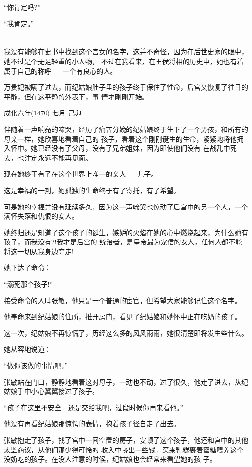 \documentclass[11pt,a4paper,onecolumn]{article}
\begin{document}
``你肯定吗?''

``我肯定。''

\section[\thesection]{}

我没有能够在史书中找到这个宫女的名字，这并不奇怪，因为在后世史家的眼中，她不过是个无足轻重的小人物，
不过在我看来，在王侯将相的历史中，她也有着属于自己的称呼 --- 一个有良心的人。

万贵妃被瞒了过去，而纪姑娘肚子里的孩子终于保住了性命，后宫又恢复了往日的平静，但在这平静的外表下，事
情才刚刚开始。

成化六年(1470) 七月 己卯

伴随着一声响亮的啼哭，经历了痛苦分娩的纪姑娘终于生下了一个男孩，和所有的母亲一样，她欣喜地看着自己的
孩子，看着这个刚刚诞生的生命，紧紧地将他拥入怀中。她已经没有了父母，没有了兄弟姐妹，因为即使他们没有
在战乱中死去，也注定永远不能再见面。

现在她终于有了在这个世界上唯一的亲人 --- 儿子。

这是幸福的一刻，她孤独的生命终于有了寄托，有了希望。

可是她的幸福并没有延续多久，因为这一声啼哭也惊动了后宫中的另一个人，一个满怀失落和仇恨的女人。

她终归还是知道了这个孩子的诞生，嫉妒的火焰在她的心中燃烧起来，为什么她有孩子，而我没有?!我才是后宫的
统治者，是皇帝最为宠信的女人，任何人都不能将这一切从我身边夺走!

她下达了命令：

``溺死那个孩子!''

接受命令的人叫张敏，他只是一个普通的宦官，但希望大家能够记住这个名字。

他奉命来到纪姑娘的住所，推开房门，看见了纪姑娘和她怀中正在吃奶的孩子。

这一次，纪姑娘不再惊慌了，历经这么多的风风雨雨，她很清楚即将发生些什么。

她从容地说道：

``做你该做的事情吧。''

张敏站在门口，静静地看着这对母子，一动也不动，过了很久，他走了进去，从纪姑娘手中小心翼翼接过了孩子。

``孩子在这里不安全，还是交给我吧，过段时候你再来看他。''

他没有再看纪姑娘那惊愕的表情，抱着孩子径自走了出去。

张敏抱走了孩子，找了宫中一间空置的房子，安顿了这个孩子，他还和宫中的其他太监商议，从他们那少得可怜的
收入中挤出一些钱，买来乳糕裹着蜜糖喂养这个没奶吃的孩子。在没人注意的时候，纪姑娘也会经常来看望她的孩
子。
\end{document}
